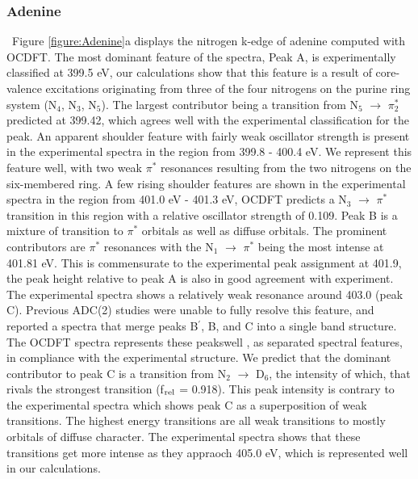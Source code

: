 \documentclass[12pt]{article}
\begin{document}
\subsubsection{Adenine} \ Figure \ref{figure:Adenine}a displays the nitrogen k-edge of adenine computed with OCDFT. The most dominant feature of the spectra, Peak A, is experimentally classified at 399.5 eV, our calculations show that this feature is a result of core-valence excitations originating from three of the four nitrogens on the purine ring system (N$_4$, N$_3$, N$_5$). The largest contributor being a transition from N$_5$ $\rightarrow$ $\pi_2^*$ predicted at 399.42, which agrees well with the experimental classification for the peak. An apparent shoulder feature with fairly weak oscillator strength is present in the experimental spectra in the region from 399.8 - 400.4 eV. We represent this feature well, with two weak $\pi^*$ resonances resulting from the two nitrogens on the six-membered ring. A few rising shoulder features are shown in the experimental spectra in the region from 401.0 eV - 401.3 eV, OCDFT predicts a N$_3$ $\rightarrow$ $\pi^*$ transition in this region with a relative oscillator strength of 0.109. Peak B is a mixture of transition to $\pi^*$ orbitals as well as diffuse orbitals. The prominent contributors are $\pi^*$ resonances with the N$_1$ $\rightarrow$ $\pi^*$ being the most intense at 401.81 eV. This is commensurate to the experimental peak assignment at 401.9, the peak height relative to peak A is also in good agreement with experiment. The experimental spectra shows a relatively weak resonance around 403.0 (peak C). Previous ADC(2) studies were unable to fully resolve this feature, and reported a spectra that merge peaks B$^{\prime}$, B, and C into a single band structure. The OCDFT spectra represents these peakswell , as separated spectral features, in compliance with the experimental structure. We predict that the dominant contributor to peak C is a transition from N$_2$ $\rightarrow$ D$_6$, the intensity of which, that rivals the strongest transition (f$_{\rm rel}$ = 0.918). This peak intensity is contrary to the experimental spectra which shows peak C  as a superposition of weak transitions. The highest energy transitions are all weak transitions to mostly orbitals of diffuse character. The experimental spectra shows that these transitions get more intense as they appraoch 405.0 eV, which is represented well in our calculations. \\
\end{document}
